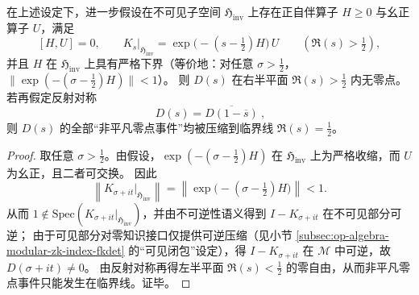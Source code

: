 \begin{theorem}\label{thm:op-algebra-hzom-commuting-polar-forces-critical-line}
在上述设定下，进一步假设在不可见子空间 \(\mathfrak{H}_{\mathrm{inv}}\) 上存在正自伴算子 \(H\ge 0\) 与幺正算子 \(U\)，满足
\[
[H,U]=0,
\qquad
K_s\big|_{\mathfrak{H}_{\mathrm{inv}}}
=\exp\!\bigl(-(s-\tfrac12)H\bigr)\,U\qquad(\Re(s)>\tfrac12),
\]
并且 \(H\) 在 \(\mathfrak{H}_{\mathrm{inv}}\) 上具有严格下界（等价地：对任意 \(\sigma>\tfrac12\)，\(\|\exp(-(\sigma-\tfrac12)H)\|<1\)）。
则 \(D(s)\) 在右半平面 \(\Re(s)>\tfrac12\) 内无零点。
若再假定反射对称
\[
\boxed{\ D(s)=\overline{D(1-\overline{s})}\ },
\]
则 \(D(s)\) 的全部“非平凡零点事件”均被压缩到临界线 \(\Re(s)=\tfrac12\)。
\end{theorem}
\begin{proof}
取任意 \(\sigma>\tfrac12\)。由假设，\(\exp(-(\sigma-\tfrac12)H)\) 在 \(\mathfrak{H}_{\mathrm{inv}}\) 上为严格收缩，而 \(U\) 为幺正，且二者可交换。
因此
\[
\left\|K_{\sigma+it}\big|_{\mathfrak{H}_{\mathrm{inv}}}\right\|
=\left\|\exp\!\bigl(-(\sigma-\tfrac12)H\bigr)\right\|
<1.
\]
从而 \(1\notin\mathrm{Spec}(K_{\sigma+it}|_{\mathfrak{H}_{\mathrm{inv}}})\)，并由不可逆性语义得到 \(I-K_{\sigma+it}\) 在不可见部分可逆；
由于可见部分对零知识接口仅提供可逆压缩（见小节 \ref{subsec:op-algebra-modular-zk-index-fkdet} 的“可见闭包”设定），得 \(I-K_{\sigma+it}\) 在 \(\mathcal{M}\) 中可逆，故 \(D(\sigma+it)\neq 0\)。
由反射对称再得左半平面 \(\Re(s)<\tfrac12\) 的零自由，从而非平凡零点事件只能发生在临界线。证毕。
\end{proof}

